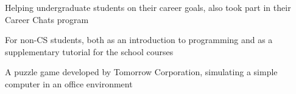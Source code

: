 \documentclass[main.tex]{subfiles}
\begin{document}
\olb

{Helping undergraduate students on their career goals, also took part in their Career Chats program}

{For non-CS students, both as an introduction to programming and as a supplementary tutorial for the school courses}

{A puzzle game developed by Tomorrow Corporation, simulating a simple computer in an office environment}

\ole
\end{document}
